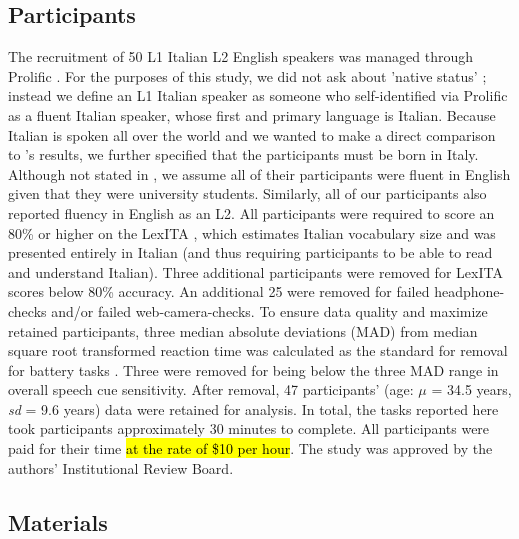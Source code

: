 
\subsection{Participants}
The recruitment of 50 L1 Italian L2 English speakers was managed through Prolific \citep{Palan_2018}. For the purposes of this study, we did not ask about 'native status' \citep{Brown_Tusmagambet_Rahming_Tu_DeSalvo_Wiener_2023}; instead we define an L1 Italian speaker as someone who self-identified via Prolific as a fluent Italian speaker, whose first and primary language is Italian. Because Italian is spoken all over the world and we wanted to make a direct comparison to \cite{Sulpizio_McQueen_2012}'s results, we further specified that the participants must be born in Italy. Although not stated in \cite{Sulpizio_McQueen_2012}, we assume all of their participants were fluent in English given that they were university students. Similarly, all of our participants also reported fluency in English as an L2. All participants were required to score an 80\% or higher on the LexITA \citep{Amenta2021}, which estimates Italian vocabulary size and was presented entirely in Italian (and thus requiring participants to be able to read and understand Italian). Three additional participants were removed for LexITA scores below 80\% accuracy. An additional 25 were removed for failed headphone-checks \citep{milne_2021} and/or failed web-camera-checks. To ensure data quality and maximize retained participants, three median absolute deviations (MAD) from median square root transformed reaction time was calculated as the standard for removal for battery tasks \citep{Leys_2013}. Three were removed for being below the three MAD \citep{Leys_2013} range in overall speech cue sensitivity. After removal, 47 participants' (age: $\mu$ = 34.5 years, \textit{sd} = 9.6 years) data were retained for analysis. In total, the tasks reported here took participants approximately 30 minutes to complete. All participants were paid for their time \hl{at the rate of \$10 per hour}. The study was approved by the authors' Institutional Review Board.

\subsection{Materials}

